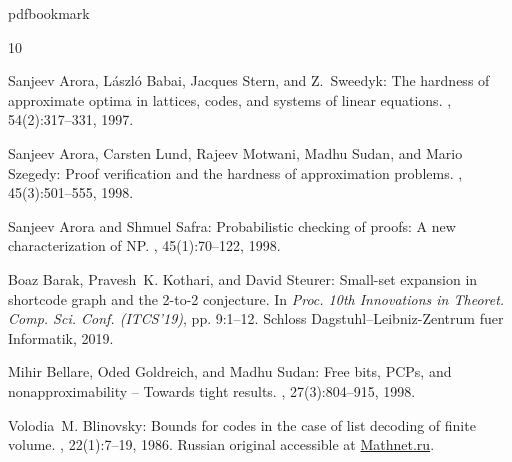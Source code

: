 \documentclass[11pt]{article}
\numberwithin{equation}{section}
\theoremstyle{definition}
\theoremstyle{plain}
\begin{document}
\newcommand{\prelim}{Preliminary version in\ }\newcommand{\prelims}{Preliminary
  versions in\ }
\providecommand{\bibhead}[1]{}
\expandafter\ifx\csname pdfbookmark\endcsname\relax%
  \providecommand{\tocrefpdfbookmark}{}
\else\providecommand{\tocrefpdfbookmark}{%
   \hypertarget{tocreferences}{}%
   \pdfbookmark[1]{References}{tocreferences}}%
\fi

\tocrefpdfbookmark
\begin{thebibliography}{10}

\bibhead{ABSS}
{\sc Sanjeev Arora, L{\'{a}}szl{\'{o}} Babai, Jacques Stern, and Z.~Sweedyk}:
  The hardness of approximate optima in lattices, codes, and systems of linear
  equations.
, 54(2):317--331, 1997.

\bibhead{ALMSS98}
{\sc Sanjeev Arora, Carsten Lund, Rajeev Motwani, Madhu Sudan, and Mario
  Szegedy}: Proof verification and the hardness of approximation problems.
, 45(3):501--555, 1998.
\newblock [\epfmtdoi{10.1145/278298.278306}]

\bibhead{AS98}
{\sc Sanjeev Arora and Shmuel Safra}: Probabilistic checking of proofs: {A} new
  characterization of {NP}.
, 45(1):70--122, 1998.
\newblock [\epfmtdoi{10.1145/273865.273901}]

\bibhead{BKS}
{\sc Boaz Barak, Pravesh~K. Kothari, and David Steurer}: Small-set expansion in
  shortcode graph and the 2-to-2 conjecture.
\newblock In {\em Proc. 10th Innovations in Theoret. Comp. Sci. Conf.
  (ITCS'19)}, pp. 9:1--12. Schloss Dagstuhl--Leibniz-Zentrum fuer Informatik,
  2019.

\bibhead{BGS}
{\sc Mihir Bellare, Oded Goldreich, and Madhu Sudan}: Free bits, {PCP}s, and
  nonapproximability -- {T}owards tight results.
, 27(3):804--915, 1998.
\newblock [\epfmtdoi{10.1137/S0097539796302531}]

\bibhead{Bli1}
{\sc Volodia~M. Blinovsky}: Bounds for codes in the case of list decoding of
  finite volume.
, 22(1):7--19, 1986.
\newblock Russian original accessible at
  \href{https://www.mathnet.ru/php/archive.phtml?wshow=paper&jrnid=ppi&paperid=839&option\_lang=eng}{Mathnet.ru}.


\end{thebibliography}
\end{document}
